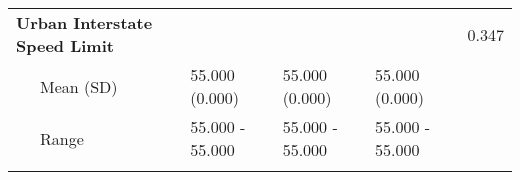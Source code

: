 \begin{longtable}[c]{@{}lllll@{}}
\begin{minipage}[t]{0.33\columnwidth}\raggedright
\textbf{Urban Interstate Speed Limit}
\end{minipage} & \begin{minipage}[t]{0.15\columnwidth}\raggedright
\end{minipage} & \begin{minipage}[t]{0.15\columnwidth}\raggedright
\end{minipage} & \begin{minipage}[t]{0.15\columnwidth}\raggedright
\end{minipage} & \begin{minipage}[t]{0.52\columnwidth}\raggedright
0.347
\end{minipage}
\\\addlinespace
\begin{minipage}[t]{0.33\columnwidth}\raggedright
~~~Mean (SD)
\end{minipage} & \begin{minipage}[t]{0.15\columnwidth}\raggedright
55.000 (0.000)
\end{minipage} & \begin{minipage}[t]{0.15\columnwidth}\raggedright
55.000 (0.000)
\end{minipage} & \begin{minipage}[t]{0.15\columnwidth}\raggedright
55.000 (0.000)
\end{minipage} & \begin{minipage}[t]{0.52\columnwidth}\raggedright
\end{minipage}
\\\addlinespace
\begin{minipage}[t]{0.33\columnwidth}\raggedright
~~~Range
\end{minipage} & \begin{minipage}[t]{0.15\columnwidth}\raggedright
55.000 - 55.000
\end{minipage} & \begin{minipage}[t]{0.15\columnwidth}\raggedright
55.000 - 55.000
\end{minipage} & \begin{minipage}[t]{0.15\columnwidth}\raggedright
55.000 - 55.000
\end{minipage} & \begin{minipage}[t]{0.52\columnwidth}\raggedright
\end{minipage}
\\\addlinespace
\bottomrule
\end{longtable}
